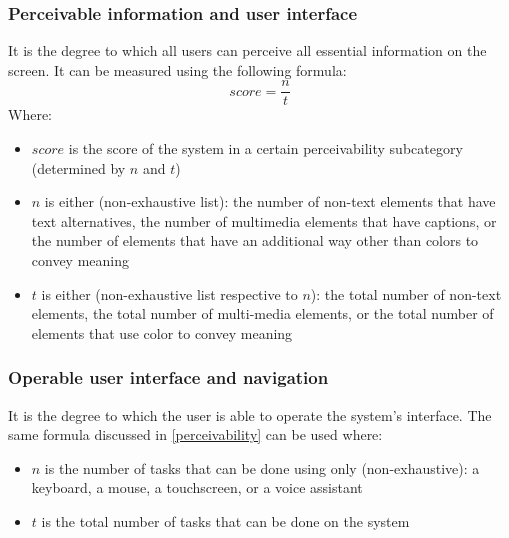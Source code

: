 \documentclass[11pt,a4paper]{article}
\begin{document}
\subsubsection{\label{perceivability}Perceivable information and user interface}
It is the degree to which all users can perceive all essential information on the screen.
It can be measured using the following formula:
\[score = \frac{n}{t}\]
Where:
\begin{itemize}
    \item $score$ is the score of the system in a certain perceivability subcategory (determined by $n$ and $t$)
    \item $n$ is either (non-exhaustive list): the number of non-text elements that have text alternatives,
          the number of multimedia elements that have captions,
          or the number of elements that have an additional way other than colors to convey meaning
    \item $t$ is either (non-exhaustive list respective to $n$):
          the total number of non-text elements,
          the total number of multi-media elements,
          or the total number of elements that use color to convey meaning
\end{itemize}

\subsubsection{Operable user interface and navigation}
It is the degree to which the user is able to operate the system's interface.
The same formula discussed in \ref{perceivability} can be used where:
\begin{itemize}
    \item $n$ is the number of tasks that can be done using only (non-exhaustive):
          a keyboard, a mouse, a touchscreen, or a voice assistant
    \item $t$ is the total number of tasks that can be done on the system
\end{itemize}
\end{document}
